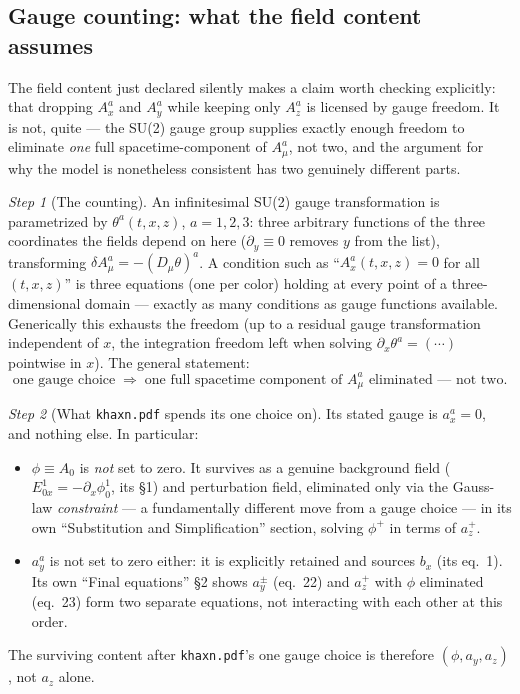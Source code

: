 \documentclass[11pt,a4paper]{article}
\numberwithin{equation}{section}
\theoremstyle{remark}
\newtheorem{step}{Step}[subsection]
\begin{document}
\subsection{Gauge counting: what the field content assumes}
\label{ssec:gaugecount}

The field content just declared silently makes a claim worth checking
explicitly: that dropping $A_x^a$ and $A_y^a$ while keeping only $A_z^a$
is licensed by gauge freedom. It is not, quite --- the SU(2) gauge group
supplies exactly enough freedom to eliminate \emph{one} full
spacetime-component of $A_\mu^a$, not two, and the argument for why the
model is nonetheless consistent has two genuinely different parts.

\begin{step}[The counting]
An infinitesimal SU(2) gauge transformation is parametrized by
$\theta^a(t,x,z)$, $a=1,2,3$: three arbitrary functions of the three
coordinates the fields depend on here ($\partial_y\equiv0$ removes $y$
from the list), transforming $\delta A_\mu^a=-(D_\mu\theta)^a$. A
condition such as ``$A_x^a(t,x,z)=0$ for all $(t,x,z)$'' is three
equations (one per color) holding at every point of a three-dimensional
domain --- exactly as many conditions as gauge functions available.
Generically this exhausts the freedom (up to a residual gauge
transformation independent of $x$, the integration freedom left when
solving $\partial_x\theta^a=(\cdots)$ pointwise in $x$). The general
statement:
\begin{equation}
\boxed{\text{one gauge choice}\;\Longrightarrow\;\text{one full
spacetime component of }A_\mu^a\text{ eliminated --- not two.}}
\label{eq:gaugecounting}
\end{equation}
\end{step}

\begin{step}[What \texttt{khaxn.pdf} spends its one choice on]
Its stated gauge is $a_x^a=0$, and nothing else. In particular:
\begin{itemize}
\item $\phi\equiv A_0$ is \emph{not} set to zero. It survives as a
genuine background field ($E^1_{0x}=-\partial_x\phi^1_0$, its \S1) and
perturbation field, eliminated only via the Gauss-law \emph{constraint}
--- a fundamentally different move from a gauge choice --- in its own
``Substitution and Simplification'' section, solving $\phi^+$ in terms of
$a_z^+$.
\item $a_y^a$ is not set to zero either: it is explicitly retained and
sources $b_x$ (its eq.~1). Its own ``Final equations'' \S2 shows
$a_y^\pm$ (eq.~22) and $a_z^+$ with $\phi$ eliminated (eq.~23) form two
separate equations, not interacting with each other at this order.
\end{itemize}
The surviving content after \texttt{khaxn.pdf}'s one gauge choice is
therefore $(\phi,a_y,a_z)$, not $a_z$ alone.
\end{step}
\end{document}
